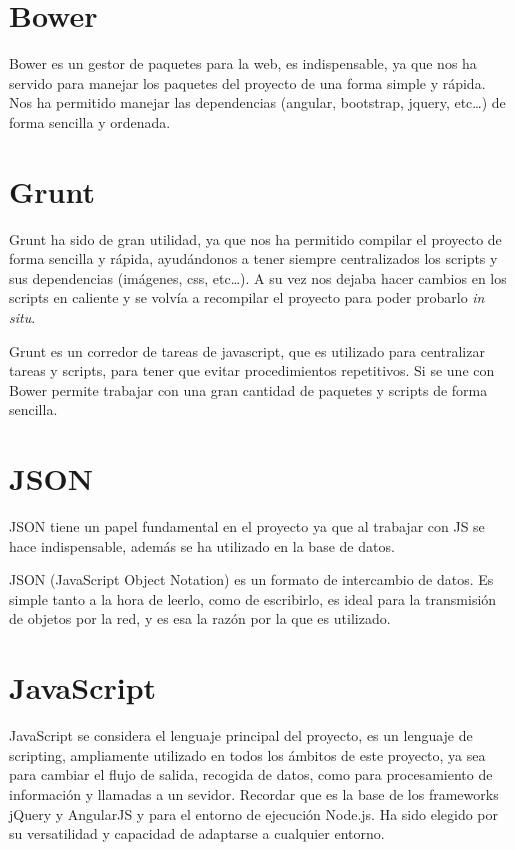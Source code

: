 \section{Bower}\label{Bower}

Bower es un gestor de paquetes para la web, es indispensable, ya que nos ha servido para manejar los paquetes del proyecto de una forma simple y rápida. Nos ha permitido manejar las dependencias (angular, bootstrap, jquery, etc\ldots) de forma sencilla y ordenada. 

\section{Grunt}\label{Grunt}

Grunt ha sido de gran utilidad, ya que nos ha permitido compilar el proyecto de forma sencilla y rápida, ayudándonos a tener siempre centralizados los scripts y sus dependencias (imágenes, css, etc\ldots ). A su vez nos dejaba hacer cambios en los scripts en caliente y se volvía a recompilar el proyecto para poder probarlo \textit{in situ}.

Grunt es un corredor de tareas de javascript, que es utilizado para centralizar tareas y scripts, para tener que evitar procedimientos repetitivos. Si se une con Bower permite trabajar con una gran cantidad de paquetes y scripts de forma sencilla.

\section{JSON}\label{JSON}
JSON tiene un papel fundamental en el proyecto ya que al trabajar con JS se hace indispensable, además se ha utilizado en la base de datos.

JSON (JavaScript Object Notation) es un formato de intercambio de datos. Es simple tanto a  la  hora de leerlo, como de escribirlo, es ideal para la transmisión de objetos por la red, y es esa la razón por la que es utilizado.

\section{JavaScript}\label{JavaScript}

JavaScript se considera el lenguaje principal del proyecto, es un lenguaje de scripting, ampliamente utilizado en todos los ámbitos de este proyecto, ya sea para cambiar el flujo de salida, recogida de datos, como para procesamiento de información y llamadas a un sevidor. Recordar que es la base de los frameworks jQuery y AngularJS y para el entorno de ejecución Node.js. Ha sido elegido por su versatilidad y capacidad de adaptarse a cualquier entorno.

